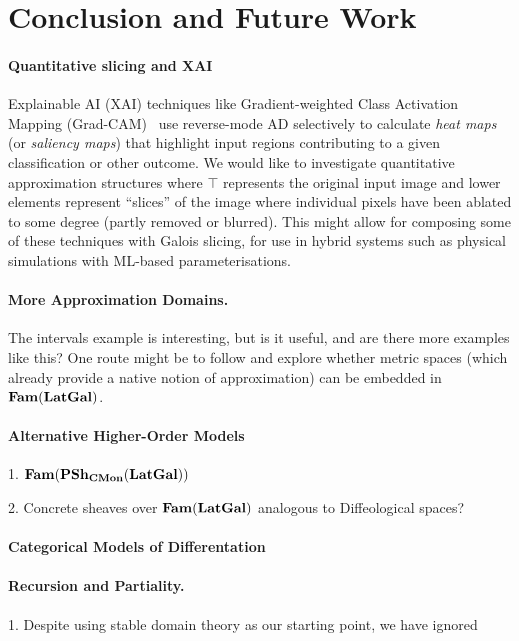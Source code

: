 \section{Conclusion and Future Work}
\label{sec:conclusion}

\paragraph{Quantitative slicing and XAI}  Explainable AI (XAI) techniques like Gradient-weighted Class
Activation Mapping (Grad-CAM)~\cite{selvaraju20} use reverse-mode AD selectively to calculate \emph{heat maps}
(or \emph{saliency maps}) that highlight input regions contributing to a given classification or other
outcome. We would like to investigate quantitative approximation structures where $\top$ represents the
original input image and lower elements represent ``slices'' of the image where individual pixels have been
ablated to some degree (partly removed or blurred). This might allow for composing some of these techniques
with Galois slicing, for use in hybrid systems such as physical simulations with ML-based parameterisations.

\paragraph{More Approximation Domains.} The intervals example is
interesting, but is it useful, and are there more examples like this?
One route might be to follow \cite{edalat-heckmann98} and explore
whether metric spaces (which already provide a native notion of
approximation) can be embedded in $\mathbf{Fam}(\mathbf{LatGal})$.

\paragraph{Alternative Higher-Order Models}

1. $\mathbf{Fam}(\mathbf{PSh}_{\mathbf{CMon}}(\mathbf{LatGal}))$

2. Concrete sheaves over $\mathbf{Fam}(\mathbf{LatGal})$ analogous to Diffeological spaces?

\paragraph{Categorical Models of Differentation}

\paragraph{Recursion and Partiality.}
1. Despite using stable domain theory as our starting point, we have ignored

